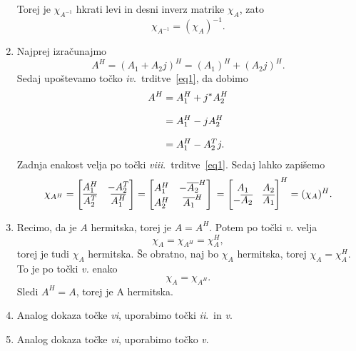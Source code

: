 \documentclass[mat1, tisk]{fmfdelo}
\numberwithin{equation}{section}
\begin{document}
\begin{dokaz}
\begin{enumerate}
        Torej je $\chi_{A^{-1}}$ hkrati levi in desni inverz matrike $\chi_A$, zato
        \[
        \chi_{A^{-1}}=(\chi_A)^{-1}.
        \]
        \item Najprej izračunajmo
        $$A^{H} = (A_{1} + A_{2}j)^{H} 
                    = (A_{1})^{H} + (A_{2}j)^{H}. $$
        Sedaj upoštevamo točko \textit{iv}.\ trditve~\ref{eq1}, da dobimo
        \begin{equation*}
            \setlength{\jot}{10pt}
                \begin{aligned}
                    A^{H} &= A_{1}^{H} + j^{*} A_{2}^{H} \\
                    &= A_{1}^{H} - j A_{2}^{H} \\
                    &= A_{1}^{H} - A_{2}^{T} j.
                \end{aligned}  
        \end{equation*}
        Zadnja enakost velja po točki \textit{viii}.\ trditve~\ref{eq1}. Sedaj lahko zapišemo
        $$\chi_{A^{H}} = 
        \Bigg[\begin{matrix}
            A_{1}^{H} &  - A_{2}^{T} \\
            \overline{A_{2}^{T}} & \overline{A_{1}^{H}}
        \end{matrix}\Bigg] \\
        = 
        \begin{bmatrix}
            A_{1}^{H} & - \overline{A_{2}}^{H} \\
            A_{2}^{H} & \overline{A_{1}}^{H}
        \end{bmatrix} \\
        =
        \Bigg[\begin{matrix}
            A_{1} & A_{2} \\
            - \overline{A_{2}} & \overline{A_{1}}
        \end{matrix}\Bigg]^{H} \\
        = (\chi_{A})^{H}.$$
        \item Recimo, da je $A$ hermitska, torej je
        $A = A^{H}$.
        Potem po točki \textit{v.} velja
        $$\chi_{A} = \chi_{A^{H}} = \chi_{A}^{H},$$
        torej je tudi $\chi_{A}$ hermitska. Še obratno, naj bo $\chi_{A}$ hermitska, torej
        $\chi_{A} = \chi_{A}^{H}$.
        To je po točki \textit{v.} enako
        $$\chi_{A} = \chi_{A^{H}}.$$
        Sledi
        $A^{H} = A$,
        torej je A hermitska.
        \item Analog dokaza točke \textit{vi}, uporabimo točki \textit{ii}.\ in \textit{v}.
        \item Analog dokaza točke \textit{vi}, uporabimo točko \textit{v}.
    \end{enumerate}
\end{dokaz}
\end{document}
